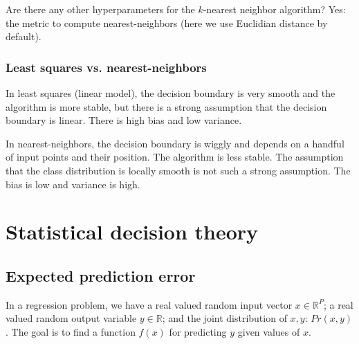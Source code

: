 \documentclass[a4paper,12pt]{article}
\begin{document}
Are there any other hyperparameters for the $k$-nearest neighbor algorithm? Yes: the metric to compute nearest-neighbors (here we use Euclidian distance by default). 

\subsubsection{Least squares vs. nearest-neighbors}

In least squares (linear model), the decision boundary is very smooth and the algorithm is more stable, but there is a strong assumption that the decision boundary is linear. There is high bias and low variance. 

In nearest-neighbors, the decision boundary is wiggly and depends on a handful of input points and their position. The algorithm is less stable. The assumption that the class distribution is locally smooth is not such a strong assumption. The bias is low and variance is high. 



\clearpage

\section{Statistical decision theory}

\subsection{Expected prediction error}

In a regression problem, we have a real valued random input vector $x \in \mathbb{R}^P$; a real valued random output variable $y \in \mathbb{R}$; and the joint distribution of $x, y$: $Pr(x, y)$. The goal is to find a function $f(x)$ for predicting $y$ given values of $x$. 
\end{document}
